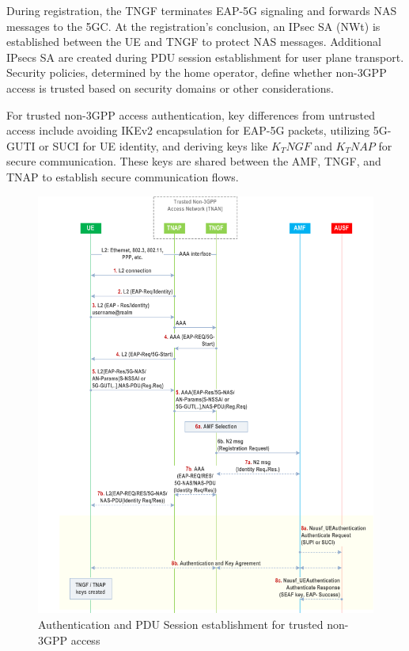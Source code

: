 During registration, the \ac{TNGF} terminates \ac{EAP-5G} signaling and forwards \ac{NAS} messages to the \ac{5GC}. At the registration's conclusion, an \ac{IPsec} SA (NWt) is established between the \ac{UE} and \ac{TNGF} to protect \ac{NAS} messages. Additional \acp{IPsec} SA are created during \ac{PDU} session establishment for user plane transport. Security policies, determined by the home operator, define whether non-\ac{3GPP} access is trusted based on security domains or other considerations.

For trusted non-\ac{3GPP} access authentication, key differences from untrusted access include avoiding \ac{IKEv2} encapsulation for \ac{EAP-5G} packets, utilizing \ac{5G-GUTI} or \ac{SUCI} for \ac{UE} identity, and deriving keys like $K_TNGF$ and $K_TNAP$ for secure communication. These keys are shared between the \ac{AMF}, \ac{TNGF}, and \ac{TNAP} to establish secure communication flows.

\begin{figure}
    \centering
    \includegraphics[width=0.75\linewidth]{figs/Authentication and PDU Session establishment for trusted non-3GPP access_1.png}
    \caption{Authentication and \ac{PDU} Session establishment for trusted non-\ac{3GPP} access}
    \label{fig:Authentication and PDU Session establishment for trusted non-3GPP access_1}
\end{figure}

